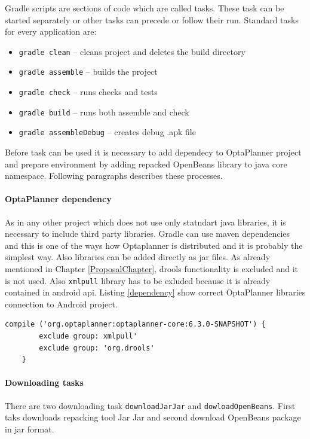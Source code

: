 Gradle scripts are sections of code which are called tasks. These task can be started separately or other tasks can
precede or follow their run. Standard tasks for every application are:
\begin{itemize}
  \item \texttt{gradle clean} -- cleans project and deletes the build directory
  \item \texttt{gradle assemble} -- builds the project
  \item \texttt{gradle check} -- runs checks and tests
  \item \texttt{gradle build} -- runs both assemble and check
  \item \texttt{gradle assembleDebug} -- creates debug .apk file
\end{itemize}

Before task can be used it is necessary to add dependecy to OptaPlanner project and prepare environment by adding
repacked OpenBeans library to java core namespace. Following paragraphs describes these processes.

\paragraph{OptaPlanner dependency}
As in any other project which does not use only statndart java libraries, it is necessary to include third party
libraries. Gradle can use maven dependencies and this is one of the ways how Optaplanner is distributed and it is
probably the simplest way. Also libraries can be added directly as jar files. As already mentioned in Chapter
\ref{ProposalChapter}, drools functionality is excluded and it is not used. Also \texttt{xmlpull} library has to be
exluded because it is already contained in android api. Listing \ref{dependency} show correct OptaPlanner libraries
connection to Android project.
\\
\begin{lstlisting}[captionpos={b},caption={Optaplanner maven dependency in gradle script},frame={lines},label={dependency},basicstyle=\footnotesize]
compile ('org.optaplanner:optaplanner-core:6.3.0-SNAPSHOT') {
        exclude group: xmlpull'
        exclude group: 'org.drools'
    }
\end{lstlisting}

\paragraph{Downloading tasks}
There are two downloading task \texttt{downloadJarJar} and \texttt{dowloadOpenBeans}. First taks downloads repacking
tool Jar Jar and second download OpenBeans package in jar format.

